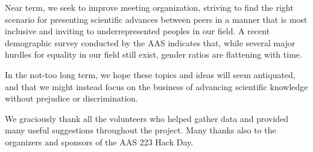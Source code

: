 \documentclass[iop]{emulateapj}
\begin{document}
Near term, we seek to improve meeting organization, striving to find the right scenario for presenting scientific advances between peers in a manner that is most inclusive and inviting to underrepresented peoples in our field. A recent demographic survey conducted by the AAS indicates that, while several major hurdles for equality in our field still exist, gender ratios are flattening with time.

In the not-too long term, we hope these topics and ideas will seem antiquated, and that we might instead focus on the business of advancing scientific knowledge without prejudice or discrimination. 






\acknowledgements
We graciously thank all the volunteers who helped gather data and provided many useful suggestions throughout the project. Many thanks also to the organizers and sponsors of the AAS 223 Hack Day.
\end{document}
